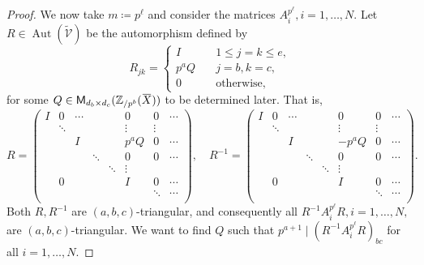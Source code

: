 \documentclass[letterpaper, 11pt, thm-restate]{article}
\numberwithin{equation}{section}
\newcommand{\Z}{\mathbb{Z}}
\newcommand{\Aut}{\operatorname{Aut}}
\newcommand{\M}{\mathsf{M}}
\newcommand{\tmV}{\widetilde{\mathcal{V}}}
\newcommand{\oX}{\mkern 1.5mu\overline{\mkern-1.5mu X \mkern-1.5mu}\mkern 1.5mu}
\theoremstyle{definition}
\theoremstyle{definition}
\theoremstyle{definition}
\begin{document}
\begin{proof}
    We now take $m \coloneqq p^{\ell}$ and consider the matrices $A_i^{p^{\ell}}, i = 1, \ldots, N$.
    Let $R \in \Aut(\tmV)$ be the automorphism defined by
    \[
    R_{jk} = 
    \begin{cases}
        I \quad & 1\leq j = k \leq e, \\
        p^a Q \quad & j = b, k = c, \\
        0 \quad & \text{otherwise},
    \end{cases}
    \]
    for some $Q \in \M_{d_b \times d_c}(\Z_{/p^b}(\oX))$ to be determined later.
    That is,
    \[
    R = 
    \begin{pmatrix}
        I & 0 & \cdots & & & 0 & 0 & \cdots \\    
         &  \ddots & & && \vdots & \vdots \\
         &  & I & & & p^a Q & 0 & \cdots \\
         & & & \ddots & & 0 & 0 & \cdots \\
        & & &  & \ddots & \vdots \\
        &0&&&& I & 0 & \cdots \\
        &&&&&& \ddots & \cdots \\
    \end{pmatrix},
    \quad
    R^{-1} = 
    \begin{pmatrix}
        I & 0 & \cdots & & & 0 & 0 & \cdots \\    
         &  \ddots & & && \vdots & \vdots \\
         &  & I & & & -p^a Q & 0 & \cdots \\
         & & & \ddots & & 0 & 0 & \cdots \\
        & & &  & \ddots & \vdots \\
        &0&&&& I & 0 & \cdots \\
        &&&&&& \ddots & \cdots \\
    \end{pmatrix}.
    \]
    Both $R, R^{-1}$ are $(a,b,c)$-triangular, and consequently all $R^{-1} A_i^{p^{\ell}} R, i = 1, \ldots, N,$ are $(a,b,c)$-triangular.
    We want to find $Q$ such that $p^{a+1} \mid \left(R^{-1} A_i^{p^{\ell}} R\right)_{bc}$ for all $i = 1, \ldots, N$.


\end{proof}
\end{document}
